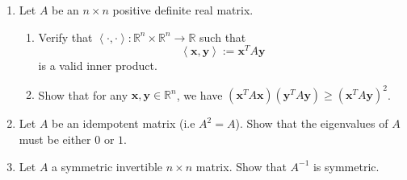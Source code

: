 \documentclass[11pt,letterpaper]{scrartcl}
\begin{document}
\begin{enumerate}
	\item Let $A$ be an $n\times n$ positive definite real matrix.
		\begin{enumerate}
		\item Verify that $\left\langle \cdot,\cdot\right\rangle :\mathbb{R}^{n}\times\mathbb{R}^{n}\to\mathbb{R}$
		such that
		\[
		\left\langle \mathbf{x},\mathbf{y}\right\rangle :=\mathbf{x}^{T}A\mathbf{y}
		\]
		is a valid inner product.
		\item Show that for any $\mathbf{x},\mathbf{y}\in\mathbb{R}^{n}$, we have
		$\left(\mathbf{x}^{T}A\mathbf{x}\right)\left(\mathbf{y}^{T}A\mathbf{y}\right)\geq\left(\mathbf{x}^{T}A\mathbf{y}\right)^{2}$. 
		\end{enumerate}

	\item Let $A$ be an idempotent matrix (i.e $A^2=A$). Show that the eigenvalues of $A$ must be either $0$ or $1$.

	\item Let $A$ a symmetric invertible $n \times n$ matrix. Show that $A^{-1}$ is symmetric.

\end{enumerate}
\end{document}
